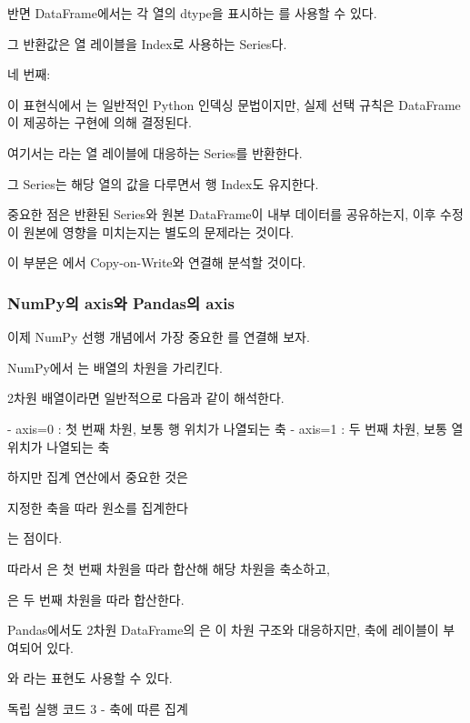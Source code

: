 반면 DataFrame에서는 각 열의 dtype을 표시하는 를 사용할 수 있다.

그 반환값은 열 레이블을 Index로 사용하는 Series다.

네 번째: 

이 표현식에서 \zsh{[]}는 일반적인 Python 인덱싱 문법이지만, 실제 선택 규칙은 DataFrame이 제공하는  구현에 의해 결정된다.

여기서는 라는 열 레이블에 대응하는 Series를 반환한다.

그 Series는 해당 열의 값을 다루면서 행 Index도 유지한다.

중요한 점은 반환된 Series와 원본 DataFrame이 내부 데이터를 공유하는지, 이후 수정이 원본에 영향을 미치는지는 별도의 문제라는 것이다.

이 부분은 에서 Copy-on-Write와 연결해 분석할 것이다.

\subsubsection{NumPy의 axis와 Pandas의 axis}

이제 NumPy 선행 개념에서 가장 중요한 를 연결해 보자.

NumPy에서 는 배열의 차원을 가리킨다.

2차원 배열이라면 일반적으로 다음과 같이 해석한다.

\begin{dhksmry}
   - axis=0 : 첫 번째 차원, 보통 행 위치가 나열되는 축
   - axis=1 : 두 번째 차원, 보통 열 위치가 나열되는 축
\end{dhksmry}

하지만 집계 연산에서 중요한 것은

\begin{dhksmry}[centered]
지정한 축을 따라 원소를 집계한다
\end{dhksmry}

는 점이다.

따라서 은 첫 번째 차원을 따라 합산해 해당 차원을 축소하고,

은 두 번째 차원을 따라 합산한다.

Pandas에서도 2차원 DataFrame의 은 이 차원 구조와 대응하지만, 축에 레이블이 부여되어 있다.

와 라는 표현도 사용할 수 있다.

\begin{dhknote}
\begin{dhksmry}[centered]
독립 실행 코드 3 - 축에 따른 집계
\end{dhksmry}
\end{dhknote}

